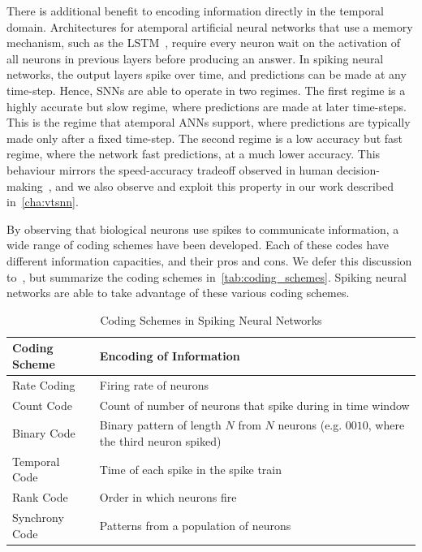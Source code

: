 \documentclass[fyp]{socreport}
\begin{document}
There is additional benefit to encoding information directly in the temporal
domain. Architectures for atemporal artificial neural networks that use a memory
mechanism, such as the LSTM~\cite{hochreiter1997long}, require every neuron wait
on the activation of all neurons in previous layers before producing an answer.
In spiking neural networks, the output layers spike over time, and predictions
can be made at any time-step. Hence, SNNs are able to operate in two regimes.
The first regime is a highly accurate but slow regime, where predictions are
made at later time-steps. This is the regime that atemporal ANNs support, where
predictions are typically made only after a fixed time-step. The second regime
is a low accuracy but fast regime, where the network fast predictions, at a much
lower accuracy. This behaviour mirrors the speed-accuracy tradeoff observed in
human decision-making~\cite{comsa19_tempor_codin_spikin_neural_networ}, and we
also observe and exploit this property in our work described
in~\autoref{cha:vtsnn}.

By observing that biological neurons use spikes to communicate information, a
wide range of coding schemes have been developed. Each of these codes have
different information capacities, and their pros and cons. We defer this
discussion to~\cite{thorpe2001spike}, but summarize the coding schemes
in~\autoref{tab:coding_schemes}. Spiking neural networks are able to take
advantage of these various coding schemes.

\begin{table}
  \centering
  \small
  \begin{tabular}{ll}
    \hline
    \hline
    \textbf{Coding Scheme} & \textbf{Encoding of Information} \\
    \hline
    Rate Coding & Firing rate of neurons \\
    Count Code & Count of number of neurons that spike during in time window \\
    Binary Code & Binary pattern of length $N$ from $N$ neurons (e.g. $0010$,
                  where the third neuron spiked) \\
    Temporal Code & Time of each spike in the spike
                    train \\
    Rank Code & Order in which neurons fire \\
    Synchrony Code & Patterns from a population of neurons \\
    \hline
    \hline
  \end{tabular}
  \normalsize
  \caption{Coding Schemes in Spiking Neural Networks}
  \label{tab:coding_schemes}
\end{table}
\end{document}
